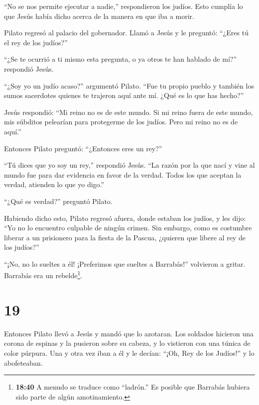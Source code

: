 ``No se nos permite ejecutar a nadie,'' respondieron los judíos.
 Esto cumplía lo que Jesús había dicho acerca de la manera
en que iba a morir.

 Pilato regresó al palacio del gobernador. Llamó a Jesús y
le preguntó: ``¿Eres tú el rey de los judíos?''

 ``¿Se te ocurrió a ti mismo esta pregunta, o ya otros te
han hablado de mí?'' respondió Jesús.

 ``¿Soy yo un judío acaso?'' argumentó Pilato. ``Fue tu
propio pueblo y también los sumos sacerdotes quienes te trajeron aquí
ante mí. ¿Qué es lo que has hecho?''

 Jesús respondió: ``Mi reino no es de este mundo. Si mi
reino fuera de este mundo, mis súbditos pelearían para protegerme de los
judíos. Pero mi reino no es de aquí.''

 Entonces Pilato preguntó: ``¿Entonces eres un rey?''

``Tú dices que yo soy un rey,'' respondió Jesús. ``La razón por la que
nací y vine al mundo fue para dar evidencia en favor de la verdad. Todos
los que aceptan la verdad, atienden lo que yo digo.''

 ``¿Qué es verdad?'' preguntó Pilato.

Habiendo dicho esto, Pilato regresó afuera, donde estaban los judíos, y
les dijo: ``Yo no lo encuentro culpable de ningún crimen. 
Sin embargo, como es costumbre liberar a un prisionero para la fiesta de
la Pascua, ¿quieren que libere al rey de los judíos?''

 ``¡No, no lo sueltes a él! ¡Preferimos que sueltes a
Barrabás!'' volvieron a gritar. Barrabás era un rebelde\footnote{\textbf{18:40}
  A menudo se traduce como ``ladrón.'' Es posible que Barrabás hubiera
  sido parte de algún amotinamiento.}.

\hypertarget{section-18}{%
\section{19}\label{section-18}}

 Entonces Pilato llevó a Jesús y mandó que lo azotaran.
 Los soldados hicieron una corona de espinas y la pusieron
sobre su cabeza, y lo vistieron con una túnica de color púrpura.
 Una y otra vez iban a él y le decían: ``¡Oh, Rey de los
Judíos!'' y lo abofeteaban.

